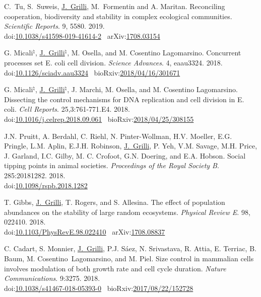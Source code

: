 \documentclass[10pt]{article}
\newcommand\JG{\underline{J.~Grilli}}
\newcommand\doilink[1]{\href{http://dx.doi.org/#1}{#1}}
\newcommand\doi[1]{doi:\doilink{#1}}
\newcommand\arxivlink[1]{\href{http://arxiv.org/abs/#1}{#1}}
\newcommand\arxiv[1]{arXiv:\arxivlink{#1}}
\newcommand\bioarxivlink[1]{\href{http://biorxiv.org/content/early/#1}{#1}}
\newcommand\bioarxiv[1]{bioRxiv:\bioarxivlink{#1}}
\begin{document}
\begin{bibenum}
    \item C.~Tu, S.~Suweis, \JG, M.~Formentin and A. Maritan.
	Reconciling cooperation, biodiversity and stability in complex ecological communities. 
    \emph{Scientific Reports}. 9, 5580. 2019.
    \\
    \doi{10.1038/s41598-019-41614-2} \
	\arxiv{1708.03154}

    \item G. Micali$^\natural$, \JG$^\natural$, M. Osella, and M. Cosentino Lagomarsino.
    Concurrent processes set E. coli cell division.
    \emph{Science Advances}. 4, eaau3324. 2018.
    \\
    \doi{10.1126/sciadv.aau3324} \
	\bioarxiv{2018/04/16/301671}


    \item G. Micali$^\natural$, \JG$^\natural$, J. Marchi, M. Osella, and M. Cosentino Lagomarsino.
    Dissecting the control mechanisms for DNA replication and cell division in E. coli.
    \emph{Cell Reports}. 25,3:761-771.E4. 2018.
    \\
    \doi{10.1016/j.celrep.2018.09.061} \
	\bioarxiv{2018/04/25/308155}

    \item J.N. Pruitt, A. Berdahl, C. Riehl, N. Pinter-Wollman, H.V. Moeller, E.G. Pringle, L.M. Aplin, E.J.H. Robinson, \JG, P. Yeh, V.M. Savage, M.H. Price, J. Garland, I.C. Gilby, M. C. Crofoot, G.N. Doering, and E.A. Hobson.
	Social tipping points in animal societies. 
    \emph{Proceedings of the Royal Society B}. 285:20181282. 2018.
    \\
    \doi{10.1098/rspb.2018.1282} \


    \item T. Gibbs, \JG, T. Rogers, and S. Allesina.
	The effect of population abundances on the stability of large random ecosystems. 
    \emph{Physical Review E}. 98, 022410. 2018.
    \\
    \doi{10.1103/PhysRevE.98.022410} \
	\arxiv{1708.08837}



    \item C. Cadart, S. Monnier, \JG,  P.J. S\'aez, N. Srivastava, R. Attia, E. Terriac, B. Baum, M. Cosentino~Lagomarsino, and M. Piel.
	Size control in mammalian cells involves modulation of both growth rate and cell cycle duration. 
    \emph{Nature Communications}. 9:3275. 2018.
    \\
    \doi{10.1038/s41467-018-05393-0} \
	\bioarxiv{2017/08/22/152728}



\end{bibenum}
\end{document}

